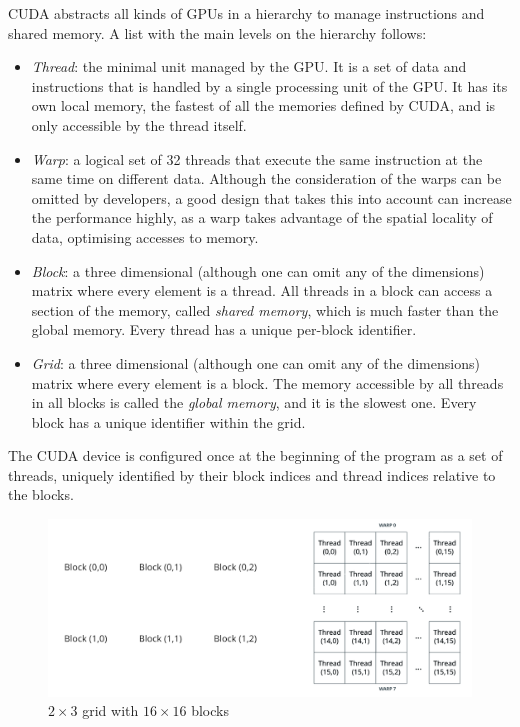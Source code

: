 \ac{CUDA} abstracts all kinds of \acp{GPU} in a hierarchy to manage instructions and shared memory. A list with the main levels on the hierarchy follows:
\begin{itemize}
	\item \emph{Thread}: the minimal unit managed by the \ac{GPU}. It is a set of data and instructions that is handled by a single processing unit of the \ac{GPU}. It has its own local memory, the fastest of all the memories defined by \ac{CUDA}, and is only accessible by the thread itself.
	\item \emph{Warp}: a logical set of 32 threads that execute the same instruction at the same time on different data. Although the consideration of the warps can be omitted by developers, a good design that takes this into account can increase the performance highly, as a warp takes advantage of the spatial locality of data, optimising accesses to memory.
	\item \emph{Block}: a three dimensional (although one can omit any of the dimensions) matrix where every element is a thread. All threads in a block can access a section of the memory, called \emph{shared memory}, which is much faster than the global memory. Every thread has a unique per-block identifier.
	\item \emph{Grid}: a three dimensional (although one can omit any of the dimensions) matrix where every element is a block. The memory accessible by all threads in all blocks is called the \emph{global memory}, and it is the slowest one. Every block has a unique identifier within the grid.
\end{itemize}

The \ac{CUDA} device is configured once at the beginning of the program as a set of threads, uniquely identified by their block indices and thread indices relative to the blocks.

\begin{figure}[bth]
	\myfloatalign
	\includegraphics[width=.8\linewidth]{gfx/cudagrid}
	\caption[$2\times3$ grid with $16\times16$ blocks]{$2\times3$ grid with $16\times16$ blocks}
	\label{fig:cudagrid}
\end{figure}

